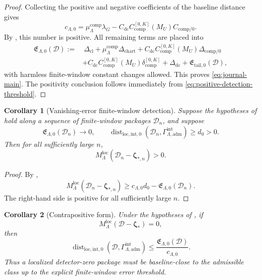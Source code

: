 \documentclass[11pt]{article}
\numberwithin{equation}{section}
\newtheorem{corollary}[corollary]{Corollary}
\theoremstyle{definition}
\theoremstyle{remark}
\newcommand{\loc}{\mathrm{loc}}
\newcommand{\intg}{\mathrm{int}}
\newcommand{\tail}{\mathrm{tail}}
\newcommand{\adm}{\mathrm{adm}}
\newcommand{\cl}{\mathrm{cl}}
\newcommand{\comp}{\mathrm{comp}}
\newcommand{\Dist}{\operatorname{dist}}
\newcommand{\calD}{\mathcal D}
\newcommand{\bzeta}{\boldsymbol\zeta}
\begin{document}
\begin{proof}
Collecting the positive and negative coefficients of the baseline distance gives
\[
        c_{\Lambda,0}
        =
        \mu_\Lambda^{\comp}\lambda_G
        -
        C_{\mathrm{dc}}C_{\comp}^{[0,K]}(M_U)C_{\comp/0}.
\]
By , this number is positive.  All remaining terms are placed into
\[
\begin{aligned}
        \mathfrak E_{\Lambda,0}(\calD)
        :=
        &\ \Delta_{\cl}
        +\mu_\Lambda^{\comp}\Delta_{\mathrm{chart}}
        +C_{\mathrm{dc}}C_{\comp}^{[0,K]}(M_U)\Delta_{\comp/0}\\
        &+C_{\mathrm{dc}}C_{\comp}^{[0,K]}(M_U)\delta_{\comp}^{[0,K]}
        +\Delta_{\mathrm{dc}}
        +\mathfrak E_{\tail,0}(\calD),
\end{aligned}
\]
with harmless finite-window constant changes allowed.  This proves \eqref{eq:journal-main}.  The positivity conclusion follows immediately from \eqref{eq:positive-detection-threshold}.
\end{proof}

\begin{corollary}[Vanishing-error finite-window detection]\label{cor:vanishing-error-detection}
Suppose the hypotheses of  hold along a sequence of finite-window packages \(\calD_n\), and suppose
\[
        \mathfrak E_{\Lambda,0}(\calD_n)\to0,
        \qquad
        \Dist_{\loc,\intg,0}(\calD_n,\Gamma^{\intg}_{\Lambda,\adm})
        \ge d_0>0.
\]
Then for all sufficiently large \(n\),
\[
        M_\Lambda^{\loc}(\calD_n-\bzeta_{*,n})>0.
\]
\end{corollary}

\begin{proof}
By ,
\[
        M_\Lambda^{\loc}(\calD_n-\bzeta_{*,n})
        \ge
        c_{\Lambda,0}d_0-
        \mathfrak E_{\Lambda,0}(\calD_n).
\]
The right-hand side is positive for all sufficiently large \(n\).
\end{proof}

\begin{corollary}[Contrapositive form]\label{cor:contrapositive-detection}
Under the hypotheses of , if
\[
        M_\Lambda^{\loc}(\calD-\bzeta_*)=0,
\]
then
\[
        \Dist_{\loc,\intg,0}(\calD,\Gamma^{\intg}_{\Lambda,\adm})
        \le
        \frac{\mathfrak E_{\Lambda,0}(\calD)}{c_{\Lambda,0}}.
\]
Thus a localized detector-zero package must be baseline-close to the admissible class up to the explicit finite-window error threshold.
\end{corollary}
\end{document}
